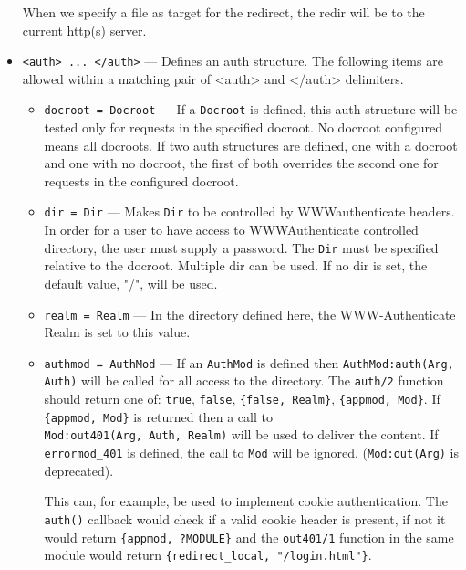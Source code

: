 \documentclass[11pt,oneside,english]{book}
\begin{document}
\begin{itemize}
              When we specify a file as target for the redirect, the redir will
              be to the current http(s) server.

\item       \verb+<auth> ... </auth>+ ---
              Defines an auth structure.  The following items are allowed within
              a matching pair of <auth> and </auth> delimiters.

              \begin{itemize}
              \item \verb+docroot = Docroot+ --- If a \verb+Docroot+ is defined,
                this auth structure will be tested only for requests in the
                specified docroot. No docroot configured means all docroots.  If
                two auth structures are defined, one with a docroot and one with
                no docroot, the first of both overrides the second one for
                requests in the configured docroot.

              \item \verb+dir = Dir+ --- Makes \verb+Dir+ to be controlled by
                WWW\-authenticate headers. In order for a user to have access to
                WWW\-Authenticate controlled directory, the user must supply a
                password. The \verb+Dir+ must be specified relative to the
                docroot. Multiple dir can be used. If no dir is set, the default
                value, "/", will be used.

              \item \verb+realm = Realm+ --- In the directory defined here, the
                WWW-Authenticate Realm is set to this value.

              \item \verb+authmod = AuthMod+ --- If an \verb+AuthMod+ is defined
                then \verb+AuthMod:auth(Arg, Auth)+ will be called for all
                access to the directory. The \verb+auth/2+ function should
                return one of: \verb+true+, \verb+false+, \verb+{false, Realm}+,
                \verb+{appmod, Mod}+. If \verb+{appmod, Mod}+ is returned then a
                call to\\ \verb+Mod:out401(Arg, Auth, Realm)+ will be used to
                deliver the content. If \verb+errormod_401+ is defined, the call
                to \verb+Mod+ will be ignored. (\verb+Mod:out(Arg)+ is
                deprecated).

                This can, for example, be used to implement cookie
                authentication. The \verb+auth()+ callback would check if a
                valid cookie header is present, if not it would return
                \verb+{appmod, ?MODULE}+ and the \verb+out401/1+ function in the
                same module would return \verb+{redirect_local, "/login.html"}+.


\end{itemize}
\end{itemize}
\end{document}
